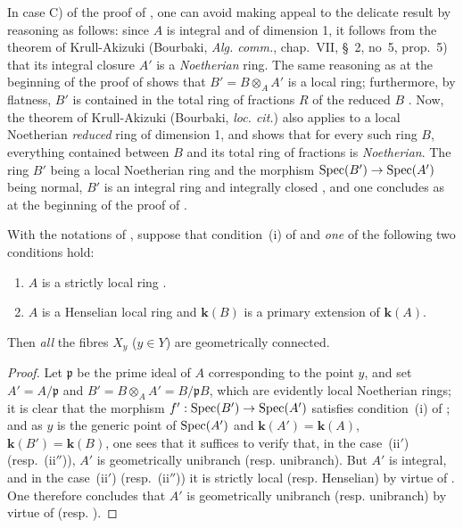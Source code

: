\begin{remark}[18.9.7.8]
\label{IV.18.9.7.8}
In case C) of the proof of , one can avoid making appeal to the delicate result  by reasoning as follows:
since $A$ is integral and of dimension 1, it follows from the theorem of Krull-Akizuki (Bourbaki, \emph{Alg. comm.}, chap.~VII, \S~2, no~5, prop.~5) that its integral closure $A'$ is a \emph{Noetherian} ring.
The same reasoning as at the beginning of the proof of  shows that $B'=B\otimes_{A}A'$ is a local ring;
furthermore, by flatness, $B'$ is contained in the total ring of fractions $R$ of the reduced $B$ .
Now, the theorem of Krull-Akizuki (Bourbaki, \emph{loc. cit.}) also applies to a local Noetherian \emph{reduced} ring of dimension 1, and shows that for every such ring $B$, everything contained between $B$ and its total ring of fractions is \emph{Noetherian}.
The ring $B'$ being a local Noetherian ring and the morphism $\operatorname{Spec}(B')\to\operatorname{Spec}(A')$ being normal, $B'$ is an integral ring and integrally closed , and one concludes as at the beginning of the proof of .
\end{remark}

\begin{corollary}[18.9.8]
\label{IV.18.9.8}
With the notations of , suppose that condition~\textup{(i)} of  and \emph{one} of the following two conditions hold:
\begin{enumerate}
  \item[\rm\textup{(ii$'$)}] $A$ is a strictly local ring .
  \item[\rm\textup{(ii$''$)}] $A$ is a Henselian local ring and $\boldsymbol{k}(B)$ is a primary extension of $\boldsymbol{k}(A)$.
\end{enumerate}
Then \emph{all} the fibres $X_y$ \textup{($y\in Y$)} are geometrically connected.
\end{corollary}

\begin{proof}
Let $\mathfrak{p}$ be the prime ideal of $A$ corresponding to the point $y$, and set $A'=A/\mathfrak{p}$ and $B'=B\otimes_{A}A'=B/\mathfrak{p}B$, which are evidently local Noetherian rings;
it is clear that the morphism $f':\operatorname{Spec}(B')\to\operatorname{Spec}(A')$ satisfies condition~(i) of ;
and as $y$ is the generic point of $\operatorname{Spec}(A')$ and $\boldsymbol{k}(A')=\boldsymbol{k}(A)$, $\boldsymbol{k}(B')=\boldsymbol{k}(B)$, one sees that it suffices to verify that, in the case~(ii$'$) (resp.~(ii$''$)), $A'$ is geometrically unibranch (resp. unibranch).
But $A'$ is integral, and in the case~(ii$'$) (resp.~(ii$''$)) it is strictly local (resp. Henselian) by virtue of .
One therefore concludes that $A'$ is geometrically unibranch (resp. unibranch) by virtue of  (resp. ).
\end{proof}

